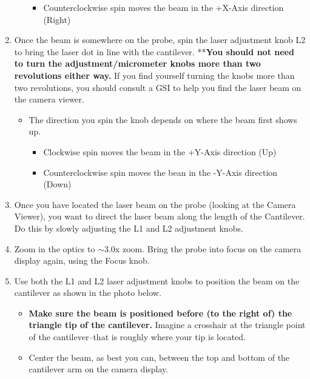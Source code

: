 \documentclass{../lab}
\begin{document}
\begin{enumerate}
\begin{itemize}
\begin{itemize}
            \item Counterclockwise spin moves the beam in the +X-Axis direction (Right)
        \end{itemize}
    \end{itemize}

    \item Once the beam is somewhere on the probe, spin the laser adjustment knob L2 to bring the laser dot in line with the cantilever.  **\textbf{You should not need to turn the adjustment/micrometer knobs more than two revolutions either way.  }If you find yourself turning the knobs more than two revolutions, you should consult a GSI to help you find the laser beam on the camera viewer.

    \begin{itemize}
        \item The direction you spin the knob depends on where the beam first shows up.
        \begin{itemize}
            \item Clockwise spin moves the beam in the +Y-Axis direction (Up)

            \item Counterclockwise spin moves the bean in the -Y-Axis direction (Down)
        \end{itemize}
    \end{itemize}

    \item Once you have located the laser beam on the probe (looking at the Camera Viewer), you want to direct the laser beam along the length of the Cantilever.  Do this by slowly adjusting the L1 and L2 adjustment knobs.

    \item Zoom in the optics to $\sim$3.0x zoom.  Bring the probe into focus on the camera display again, using the Focus knob.

    \item Use both the L1 and L2 laser adjustment knobs to position the beam on the cantilever as shown in the photo below.
    \begin{itemize}
        \item \textbf{Make sure the beam is positioned before (to the right of) the triangle tip of the cantilever. } Imagine a crosshair at the triangle point of the cantilever--that is roughly where your tip is located.

        \item Center the beam, as best you can, between the top and bottom of the cantilever arm on the camera display.
        

\end{itemize}
\end{enumerate}
\end{document}
